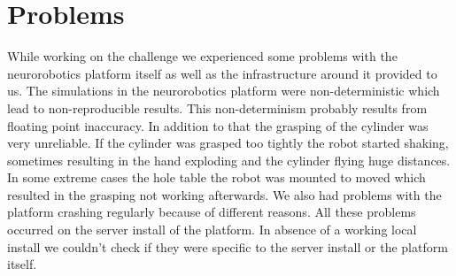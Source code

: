\section{Problems}\label{sec:problems}
While working on the challenge we experienced some problems with the neurorobotics platform itself as well as the infrastructure around it provided to us.
The simulations in the neurorobotics platform were non-deterministic which lead to non-reproducible results.
This non-determinism probably results from floating point inaccuracy.
In addition to that the grasping of the cylinder was very unreliable.
If the cylinder was grasped too tightly the robot started shaking, sometimes resulting in the hand exploding and the cylinder flying huge distances.
In some extreme cases the hole table the robot was mounted to moved which resulted in the grasping not working afterwards.
We also had problems with the platform crashing regularly because of different reasons.
All these problems occurred on the server install of the platform.
In absence of a working local install we couldn't check if they were specific to the server install or the platform itself.